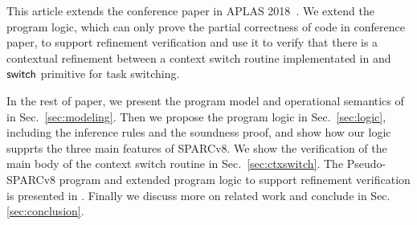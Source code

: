 This article extends the conference paper in 
APLAS 2018~\cite{zha18aplas}. We extend 
the program logic, which can only prove the partial 
correctness of \sparc{} code in conference paper, 
to support refinement verification and use it to  
verify that there is a contextual refinement between 
a context switch routine implementated 
in \sparc{} and $\mathsf{switch}$ primitive for task switching. 



In the rest of paper,
we present the program model
and operational semantics of \sparc{} in Sec.~\ref{sec:modeling}.
Then we propose the program logic in Sec.~\ref{sec:logic},
including the inference rules and the soundness proof, 
and show how our logic supprts the three main features of SPARCv8.
We show the verification of the main body of the context switch routine
in Sec.~\ref{sec:ctxswitch}. 
The Pseudo-SPARCv8 program and extended 
program logic to support refinement verification is 
presented in \Sec{\ref{sec:refine-verification-sparc}}. 
Finally we discuss more on
related work and conclude in Sec. \ref{sec:conclusion}.

